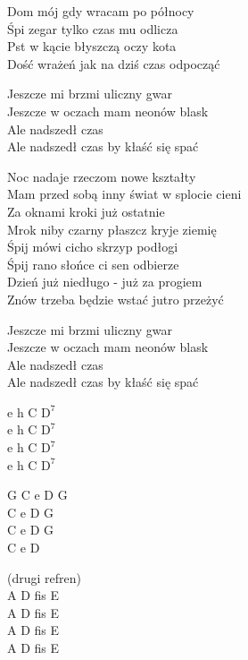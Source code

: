 \begin{text}
    Dom mój gdy wracam po północy\\
    Śpi zegar tylko czas mu odlicza\\
    Pst w kącie błyszczą oczy kota\\
    Dość wrażeń jak na dziś czas odpocząć

    \vin Jeszcze mi brzmi uliczny gwar\\
    \vin Jeszcze w oczach mam neonów blask\\
    \vin Ale nadszedł czas\\
    \vin Ale nadszedł czas by kłaść się spać

    Noc nadaje rzeczom nowe kształty\\
    Mam przed sobą inny świat w splocie cieni\\
    Za oknami kroki już ostatnie\\
    Mrok niby czarny płaszcz kryje ziemię\\

    Śpij mówi cicho skrzyp podłogi\\
    Śpij rano słońce ci sen odbierze\\
    Dzień już niedługo - już za progiem\\
    Znów trzeba będzie wstać jutro przeżyć

    \vin Jeszcze mi brzmi uliczny gwar\\
    \vin Jeszcze w oczach mam neonów blask\\
    \vin Ale nadszedł czas\\
    \vin Ale nadszedł czas by kłaść się spać
\end{text}
\begin{chord}
    e h C $\mathrm{D^7}$\\
    e h C $\mathrm{D^7}$\\
    e h C $\mathrm{D^7}$\\
    e h C $\mathrm{D^7}$

    G C e D G\\
    C e D G\\
    C e D G\\
    C e D

    \hfill\break
    \hfill\break
    \hfill\break
    \hfill\break
    \hfill\break
    \hfill\break
    \hfill\break
    \hfill\break
    \hfill\break
    (drugi refren)\\
    A D fis E\\
    A D fis E\\
    A D fis E\\
    A D fis E
\end{chord}
